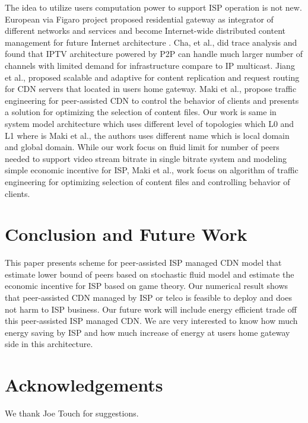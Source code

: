 \documentclass[paper]{ieice}
\begin{document}
The idea to utilize users computation power to support ISP operation is not new.  
European via Figaro project \cite{figaro} proposed residential gateway as integrator of different networks and services and become Internet-wide distributed content management for future Internet architecture \cite{figaro}. 
Cha, et al.,\cite{Cha:2008:NTP:1855641.1855646} did trace analysis and found that IPTV architecture powered by P2P can handle much larger number of channels with limited demand for infrastructure compare to IP multicast. 
Jiang et al., \cite{Jiang:2012:OMD:2413176.2413193} proposed scalable and adaptive for content replication and request routing for CDN servers that located in users home gateway. 
Maki et al.,\cite{NaoyaMAKI2012} propose traffic engineering for peer-assisted CDN to control the behavior of clients and presents a solution for optimizing the selection of content files.
Our work is same in system model architecture which uses different level of topologies which L0 and L1 where is Maki et al., \cite{NaoyaMAKI2012} the authors uses different name which is local domain and global domain. 
While our work focus on fluid limit for number of peers needed to support video stream bitrate in single bitrate system and modeling simple economic incentive for ISP, Maki et al., \cite{NaoyaMAKI2012} work focus on algorithm of traffic engineering for optimizing selection of content files and controlling behavior of clients.

\section{Conclusion and Future Work}\label{conclude}
This paper presents scheme for peer-assisted ISP managed CDN model that estimate lower bound of peers based on stochastic fluid model and estimate the economic incentive for ISP based on game theory.  
Our numerical result shows that peer-assisted CDN managed by ISP or telco is feasible to deploy and does not harm to ISP business. 
Our future work will include energy efficient trade off this peer-assisted ISP managed CDN. 
We are very interested to know how much energy saving by ISP and how much increase of energy at users home gateway side in this architecture. 





\section*{Acknowledgements}
We thank Joe Touch for suggestions.
\end{document}
